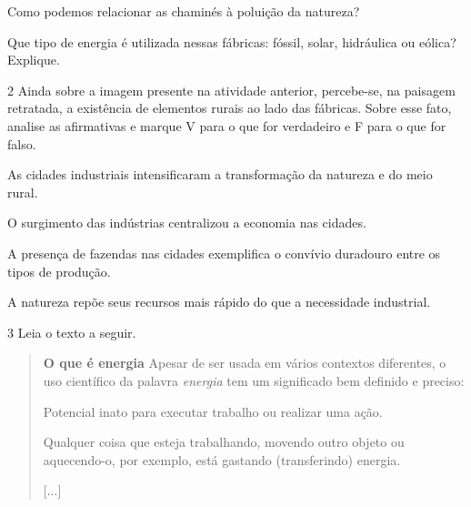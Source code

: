 \begin{escolha}
\item Como podemos relacionar as chaminés à poluição da natureza?


\item Que tipo de energia é utilizada nessas fábricas: fóssil, solar, hidráulica ou eólica? Explique.

\end{escolha}

\num{2} Ainda sobre a imagem presente na atividade anterior, percebe-se, na paisagem retratada, a existência de elementos rurais ao lado das fábricas.
Sobre esse fato, analise as afirmativas e marque V para o que for verdadeiro e F para o que for falso.

\begin{boxlist}
 As cidades industriais intensificaram a transformação da natureza e do meio rural.

 O surgimento das indústrias centralizou a economia nas cidades.

 A presença de fazendas nas cidades exemplifica o convívio duradouro entre os tipos de produção.

 A natureza repõe seus recursos mais rápido do que a necessidade industrial.
\end{boxlist}


\num{3} Leia o texto a seguir.

\begin{quote}
\textbf{O que é energia}
Apesar de ser usada em vários contextos diferentes, o uso
científico da palavra \emph{energia} tem um significado bem definido e preciso:

Potencial inato para executar trabalho ou realizar uma ação.

Qualquer
coisa que esteja trabalhando, movendo outro objeto ou aquecendo-o, por
exemplo, está gastando (transferindo) energia.

{[}...{]}

\end{quote}

